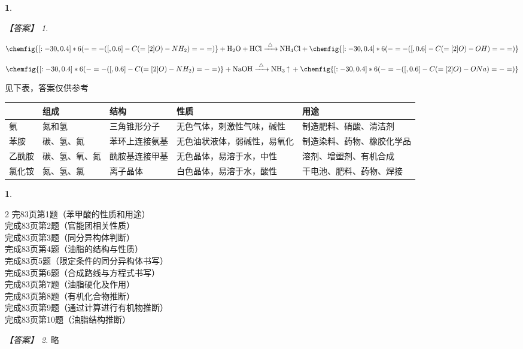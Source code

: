 \documentclass[UTF8, 10pt, a4paper, oneside]{ctexart}
\newcommand{\fs}[1]{{\fangsong #1}}%
\theoremstyle{definition}
\newtheorem{exercise}{}
\newtheorem{subexercise}{}[exercise]%
\theoremstyle{remark}
\newtheorem*{answer}{【答案】}
\theoremstyle{plain}
\begin{document}
\begin{subexercise}
\begin{answer}
\begin{inparaenum}
            \item $\chemfig{[:-30,0.4] *6(-=-([,0.6]-C(=[2]O)-NH_2)=-=)}\ce{+ H2O + HCl ->T[$\triangle$] NH4Cl + }\chemfig{[:-30,0.4] *6(-=-([,0.6]-C(=[2]O)-OH)=-=)}$
            \item $\chemfig{[:-30,0.4] *6(-=-([,0.6]-C(=[2]O)-NH_2)=-=)}\ce{+ NaOH ->T[$\triangle$] NH3 ^ + }\chemfig{[:-30,0.4] *6(-=-([,0.6]-C(=[2]O)-ONa)=-=)}$
            \item 见下表，答案仅供参考
            \begin{table}[!ht]
                \centering
                \begin{tabular}{|l|l|l|l|l|}
                    \hline
                    ~   & 组成      & 结构      & 性质             & 用途            \\ \hline
                    氨   & 氮和氢     & 三角锥形分子  & 无色气体，刺激性气味，碱性  & 制造肥料、硝酸、清洁剂   \\ \hline
                    苯胺  & 碳、氢、氮   & 苯环上连接氨基 & 无色油状液体，弱碱性，易氧化 & 制造染料、药物、橡胶化学品 \\ \hline
                    乙酰胺 & 碳、氢、氧、氮 & 酰胺基连接甲基 & 无色晶体，易溶于水，中性   & 溶剂、增塑剂、有机合成   \\ \hline
                    氯化铵 & 氮、氢、氯   & 离子晶体    & 白色晶体，易溶于水，酸性   & 干电池、肥料、药物、焊接  \\ \hline
                \end{tabular}
            \end{table}
        \end{inparaenum}
    \end{answer}
\end{subexercise}\setcounter{exercise}{23}
\begin{exercise}
    \begin{multicols}{2}
        \noindent 完83页第1题（苯甲酸的性质和用途）\\
        完成83页第2题（官能团相关性质）\\
        完成83页第3题（同分异构体判断）\\
        完成83页第4题（油脂的结构与性质）\\
        完成83页5题（限定条件的同分异构体书写）\\
        完成83页第6题（合成路线与方程式书写）\\
        完成83页第7题（油脂硬化及作用）\\
        完成83页第8题（有机化合物推断）\\
        完成83页第9题（通过计算进行有机物推断）\\
        完成83页第10题（油脂结构推断）\\
    \end{multicols}
    \begin{answer}
        \fs{略}
    \end{answer}
\end{exercise}
\end{document}
